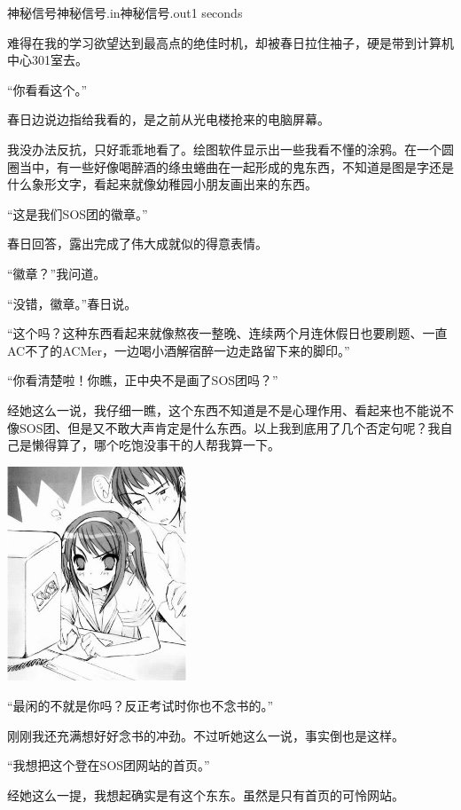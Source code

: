 \begin{problem}{神秘信号}{神秘信号.in}{神秘信号.out}{1 seconds}

难得在我的学习欲望达到最高点的绝佳时机，却被春日拉住袖子，硬是带到计算机中心301室去。

“你看看这个。”

春日边说边指给我看的，是之前从光电楼抢来的电脑屏幕。

我没办法反抗，只好乖乖地看了。绘图软件显示出一些我看不懂的涂鸦。在一个圆圈当中，有一些好像喝醉酒的绦虫蜷曲在一起形成的鬼东西，不知道是图是字还是什么象形文字，看起来就像幼稚园小朋友画出来的东西。

“这是我们SOS团的徽章。”

春日回答，露出完成了伟大成就似的得意表情。

“徽章？”我问道。

“没错，徽章。”春日说。

“这个吗？这种东西看起来就像熬夜一整晚、连续两个月连休假日也要刷题、一直AC不了的ACMer，一边喝小酒解宿醉一边走路留下来的脚印。”

“你看清楚啦！你瞧，正中央不是画了SOS团吗？”

经她这么一说，我仔细一瞧，这个东西不知道是不是心理作用、看起来也不能说不像SOS团、但是又不敢大声肯定是什么东西。以上我到底用了几个否定句呢？我自己是懒得算了，哪个吃饱没事干的人帮我算一下。

\begin{center}
\includegraphics[width=0.4\textwidth]{pics/G.jpg}
\end{center}

“最闲的不就是你吗？反正考试时你也不念书的。”

刚刚我还充满想好好念书的冲劲。不过听她这么一说，事实倒也是这样。

“我想把这个登在SOS团网站的首页。”

经她这么一提，我想起确实是有这个东东。虽然是只有首页的可怜网站。


\end{problem}
